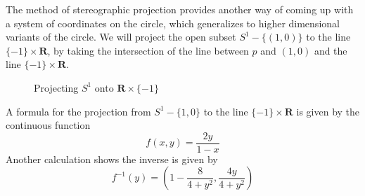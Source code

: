 \begin{example}
    The method of stereographic projection provides another way of coming up with a system of coordinates on the circle, which generalizes to higher dimensional variants of the circle. We will project the open subset $S^1 - \{ (1,0) \}$ to the line $\{ -1 \} \times \mathbf{R}$, by taking the intersection of the line between $p$ and $(1,0)$ and the line $\{ -1 \} \times \mathbf{R}$.
    \begin{figure}
    \begin{center}
    \caption{Projecting $S^1$ onto $\mathbf{R} \times \{ -1 \}$}
    \end{center}
    \end{figure}
    A formula for the projection from $S^1 - \{ 1, 0 \}$ to the line $\{ -1 \} \times \mathbf{R}$ is given by the continuous function
    \[ f(x,y) = \frac{2y}{1-x} \]
    Another calculation shows the inverse is given by
    \[ f^{-1}(y) = \left(1 - \frac{8}{4 + y^2} , \frac{4y}{4 + y^2} \right) \]
    \begin{figure}
    \begin{center}
\end{center}
\end{figure}
\end{example}
